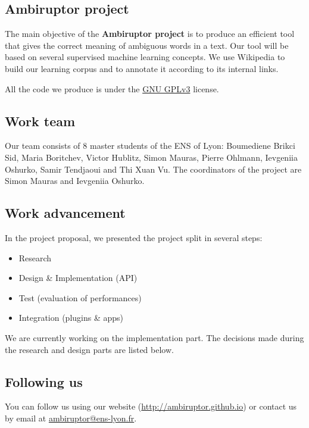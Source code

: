\documentclass[11pt,a4paper]{article}
\begin{document}
\subsection{Ambiruptor project}

The main objective of the \textbf{Ambiruptor project} is to produce an efficient tool that gives the correct meaning of ambiguous words in a text. Our tool will be based on several supervised machine learning concepts. We use Wikipedia to build our learning corpus and to annotate it according to its internal links.

\noindent All the code we produce is under the \href{http://www.gnu.org/licenses/gpl-3.0.html}{GNU GPLv3} license.

\subsection{Work team}

Our team consists of 8 master students of the ENS of Lyon: Boumediene Brikci Sid, Maria Boritchev, Victor Hublitz, Simon Mauras, Pierre Ohlmann, Ievgeniia Oshurko, Samir Tendjaoui and Thi Xuan Vu. The coordinators of the project are Simon Mauras and Ievgeniia Oshurko.

\subsection{Work advancement}

\noindent In the project proposal, we presented the project split in several steps:
\begin{itemize}
    \item Research
    \item Design \& Implementation (API)
    \item Test (evaluation of performances)
    \item Integration (plugins \& apps)
\end{itemize}
We are currently working on the implementation part. The decisions made during the research and design parts are listed below.

\newpage

\subsection{Following us}

You can follow us using our website (\url{http://ambiruptor.github.io}) or contact us by email at \url{ambiruptor@ens-lyon.fr}.
\end{document}
